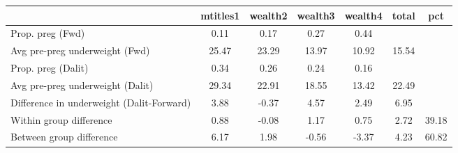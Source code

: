 \begin{tabular}{l*{6}{c}}
\toprule
            &\multicolumn{1}{c}{mtitles1}&\multicolumn{1}{c}{wealth2}&\multicolumn{1}{c}{wealth3}&\multicolumn{1}{c}{wealth4}&\multicolumn{1}{c}{total}&\multicolumn{1}{c}{pct}\\
\midrule
\midrule
Prop. preg (Fwd)&        0.11&        0.17&        0.27&        0.44&            &            \\
Avg pre-preg underweight (Fwd)&       25.47&       23.29&       13.97&       10.92&       15.54&            \\
Prop. preg (Dalit)&        0.34&        0.26&        0.24&        0.16&            &            \\
Avg pre-preg underweight (Dalit)&       29.34&       22.91&       18.55&       13.42&       22.49&            \\
Difference in underweight (Dalit-Forward)&        3.88&       -0.37&        4.57&        2.49&        6.95&            \\
Within group difference&        0.88&       -0.08&        1.17&        0.75&        2.72&       39.18\\
Between group difference&        6.17&        1.98&       -0.56&       -3.37&        4.23&       60.82\\
\bottomrule
\end{tabular}

